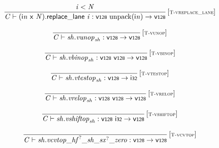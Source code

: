 $$
\begin{array}{@{}c@{}}\displaystyle
\frac{
{\mathit{i}} < {\mathit{N}}
}{
{\mathit{C}} \vdash ({\mathsf{i}}{{\mathit{n}}}~\mathsf{x}~{\mathit{N}}).\mathsf{replace\_lane}~{\mathit{i}} : \mathsf{v{\scriptstyle128}}~{\mathrm{unpack}}({\mathsf{i}}{{\mathit{n}}}) \rightarrow \mathsf{v{\scriptstyle128}}
} \, {[\textsc{\scriptsize T{-}vreplace\_lane}]}
\qquad
\end{array}
$$

$$
\begin{array}{@{}c@{}}\displaystyle
\frac{
}{
{\mathit{C}} \vdash {\mathit{sh}} . {\mathit{vunop}}_{{\mathit{sh}}} : \mathsf{v{\scriptstyle128}} \rightarrow \mathsf{v{\scriptstyle128}}
} \, {[\textsc{\scriptsize T{-}vunop}]}
\qquad
\end{array}
$$

$$
\begin{array}{@{}c@{}}\displaystyle
\frac{
}{
{\mathit{C}} \vdash {\mathit{sh}} . {\mathit{vbinop}}_{{\mathit{sh}}} : \mathsf{v{\scriptstyle128}}~\mathsf{v{\scriptstyle128}} \rightarrow \mathsf{v{\scriptstyle128}}
} \, {[\textsc{\scriptsize T{-}vbinop}]}
\qquad
\end{array}
$$

$$
\begin{array}{@{}c@{}}\displaystyle
\frac{
}{
{\mathit{C}} \vdash {\mathit{sh}} . {\mathit{vtestop}}_{{\mathit{sh}}} : \mathsf{v{\scriptstyle128}} \rightarrow \mathsf{i{\scriptstyle32}}
} \, {[\textsc{\scriptsize T{-}vtestop}]}
\qquad
\end{array}
$$

$$
\begin{array}{@{}c@{}}\displaystyle
\frac{
}{
{\mathit{C}} \vdash {\mathit{sh}} . {\mathit{vrelop}}_{{\mathit{sh}}} : \mathsf{v{\scriptstyle128}}~\mathsf{v{\scriptstyle128}} \rightarrow \mathsf{v{\scriptstyle128}}
} \, {[\textsc{\scriptsize T{-}vrelop}]}
\qquad
\end{array}
$$

$$
\begin{array}{@{}c@{}}\displaystyle
\frac{
}{
{\mathit{C}} \vdash {\mathit{sh}} . {\mathit{vshiftop}}_{{\mathit{sh}}} : \mathsf{v{\scriptstyle128}}~\mathsf{i{\scriptstyle32}} \rightarrow \mathsf{v{\scriptstyle128}}
} \, {[\textsc{\scriptsize T{-}vshiftop}]}
\qquad
\end{array}
$$

$$
\begin{array}{@{}c@{}}\displaystyle
\frac{
}{
{\mathit{C}} \vdash {\mathit{sh}} . {{{{{{{{{\mathit{vcvtop}}}{\mathsf{\_}}}{{{\mathit{hf}}^?}}}{\mathsf{\_}}}{{\mathit{sh}}}}{\mathsf{\_}}}{{{\mathit{sx}}^?}}}{\mathsf{\_}}}{{\mathit{zero}}} : \mathsf{v{\scriptstyle128}} \rightarrow \mathsf{v{\scriptstyle128}}
} \, {[\textsc{\scriptsize T{-}vcvtop}]}
\qquad
\end{array}
$$

